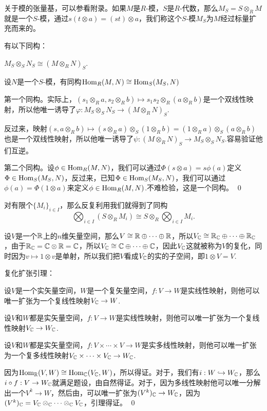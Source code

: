 \para 关于模的张量基，可以参看附录。如果$M$是$R$-模，$S$是$R$-代数，那么$M_S=S\otimes_R M$就是一个$S$-模，通过$s(t\otimes a)=(st)\otimes a$，我们称这个$S$-模$M_S$为$M$经过标量扩充而来的。

\lem 有以下同构：

 $M_S\otimes_S N_S\cong (M\otimes_R N)_S$.

 设$N$是一个$S$-模，有同构$\operatorname{Hom}_R(M,N)\cong \operatorname{Hom}_S(M_S,N)$

\proof 第一个同构。实际上，$(s_1\otimes_R a,s_2\otimes_R b)\mapsto s_1s_2\otimes_R(a\otimes_R b)$是一个双线性映射，所以他唯一诱导了$\varphi:M_S\otimes_S N_S\to (M\otimes_R N)_S$.

反过来，映射$(s,a\otimes_R b)\mapsto (s\otimes_R a)\otimes_S (1\otimes_R b)=(1\otimes_R a)\otimes_S (a\otimes_R b)$也是一个双线性映射，所以他唯一诱导了$\psi:(M\otimes_R N)_S\to M_S\otimes_S N_S$.容易验证他们互逆。

第二个同构。设$\phi\in \operatorname{Hom}_R(M,N)$，我们可以通过$\Phi(s\otimes a)=s\phi(a)$定义$\Phi\in \operatorname{Hom}_S(M_S,N)$，反过来，已知$\Phi\in \operatorname{Hom}_S(M_S,N)$，我们可以通过$\phi(a)=\Phi(1\otimes a)$来定义$\phi\in \operatorname{Hom}_R(M,N)$.不难检验，这是一个同构。 \qed

对有限个$\{M_i\}_{i\in I}$，那么反复利用我们就得到了同构
\[
\bigotimes_{i\in I} \left(S\otimes_RM_i\right)\cong S\otimes_R\bigotimes_{i\in I} M_i.
\]

\para 设$V$是一个$\mathbb{R}$上的$n$维矢量空间，那么$V\cong \mathbb{R}\oplus \cdots \oplus \mathbb{R}$，所以$V_{\mathbb{C}}\cong \mathbb{R}_{\mathbb{C}}\oplus \cdots \oplus \mathbb{R}_{\mathbb{C}}$，由于$\mathbb{R}_{\mathbb{C}}=\mathbb{C}\otimes \mathbb{R}=\mathbb{C}$，所以$V_{\mathbb{C}}\cong \mathbb{C}\oplus \cdots \oplus \mathbb{C}$，因此$V_{\mathbb{C}}$这就被称为$V$的复化，同时因为$v\mapsto 1\otimes v$是单射，所以我们把$V$看成$V_{\mathbb{C}}$的实的子空间，即$1\otimes V=V$.

\lem 复化扩张引理：

设$V$是一个实矢量空间，$W$是一个复矢量空间，$f:V\to W$是实线性映射，则他可以唯一扩张为一个复线性映射$V_{\mathbb{C}}\to W$.

设$V$和$W$都是实矢量空间，$f:V\to W$是实线性映射，则他可以唯一扩张为一个复线性映射$V_{\mathbb{C}}\to W_{\mathbb{C}}$.

设$V$和$W$都是实矢量空间，$f:V\times\cdots\times V\to W$是实多线性映射，则他可以唯一扩张为一个复多线性映射$V_{\mathbb{C}}\times\cdots\times V_{\mathbb{C}}\to W_{\mathbb{C}}$.

\proof 
	因为$\operatorname{Hom}_{\mathbb{R}}(V,W)\cong \operatorname{Hom}_{\mathbb{C}}(V_{\mathbb{C}},W)$，所以得证。对于，我们有$i:W\hookrightarrow W_{\mathbb{C}}$，那么$i\circ f:V\to W_{\mathbb{C}}$就满足题设，由自然得证。对于，因为多线性映射他可以唯一分解出一个$V^k\to W$，然后由，可以唯一扩张为$(V^k)_{\mathbb{C}}\to W_{\mathbb{C}}$，因为$(V^k)_{\mathbb{C}}=V_{\mathbb{C}}\otimes_{\mathbb{C}} \cdots\otimes_{\mathbb{C}} V_{\mathbb{C}}$，引理得证。
\qed

